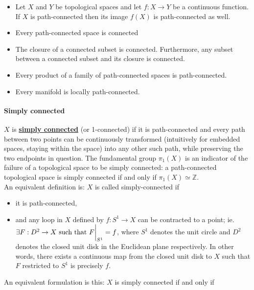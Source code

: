 \documentclass{homework}
\begin{document}
\begin{itemize}
    \item Let $X$ and $Y$ be topological spaces and let $f: X \to Y$ be a continuous function. If $X$ is path-connected then its image $f(X)$ is path-connected as well. 
    \item Every path-connected space is connected
    \item The closure of a connected subset is connected. Furthermore, any subset between a connected subset and its closure is connected. 
    \item Every product of a family of path-connected  spaces is path-connected.
    \item Every manifold is locally path-connected. \\
\end{itemize}

\paragraph{\textbf{Simply connected}}

$X$ is \textbf{\underline{simply connected}} (or 1-connected) if it is path-connected and every path between two points can be continuously transformed (intuitively for embedded spaces, staying within the space) into any other such path, while preserving the two endpoints in question. The fundamental group $\pi_1(X)$ is an indicator of the failure of a topological space to be simply connected: a path-connected topological space is simply connected if and only if $\pi_1(X) \simeq \mathds{Z}$. \\

An equivalent definition is: $X$ is called simply-connected if

\begin{itemize}
    \item it is path-connected, 
    \item and any loop in $X$ defined by $f: S^{1} \to X$ can be contracted to a point; ie. $\exists F: D^{2} \to X \textnormal{ such that } F\bigg|_{S^{1}} = f$, where ${S^{1}}$ denotes the unit circle and $D^2$ denotes the closed unit disk in the Euclidean plane respectively. In other words, there exists a continuous map from the closed unit disk to $X$ such that $F$ restricted to $S^1$ is precisely $f$.
\end{itemize}

An equivalent formulation is this: $X$ is simply connected if and only if 
\end{document}
